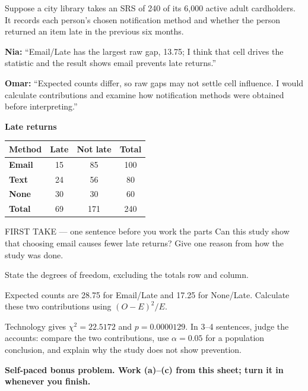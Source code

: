 \documentclass[14pt]{extarticle}
\begin{document}
\pagestyle{empty}


\noindent\begin{minipage}[t]{0.57\linewidth}
\vspace{0pt}
Suppose a city library takes an SRS of 240 of its 6,000 active adult cardholders. It records each person's chosen notification method and whether the person returned an item late in the previous six months.\par\smallskip \textbf{Nia:} ``Email/Late has the largest raw gap, 13.75; I think that cell drives the statistic and the result shows email prevents late returns.''\par \textbf{Omar:} ``Expected counts differ, so raw gaps may not settle cell influence. I would calculate contributions and examine how notification methods were obtained before interpreting.''\par
\end{minipage}\hfill
\begin{minipage}[t]{0.40\linewidth}
\vspace{0pt}
\begin{center}
\textbf{Late returns}\par\smallskip
\begin{tabular}{|l|c|c|c|}
\hline
\textbf{Method} & \textbf{Late} & \textbf{Not late} & \textbf{Total} \\ \hline
\textbf{Email} & 15 & 85 & 100 \\ \hline
\textbf{Text} & 24 & 56 & 80 \\ \hline
\textbf{None} & 30 & 30 & 60 \\ \hline
\textbf{Total} & 69 & 171 & 240 \\ \hline
\end{tabular}
\end{center}
\end{minipage}

\begin{firsttakebox}{FIRST TAKE --- one sentence before you work the parts}
Can this study show that choosing email causes fewer late returns? Give one reason from how the study was done.
\end{firsttakebox}

\begin{description}[leftmargin=1.15in, labelwidth=1in, itemsep=2pt, topsep=2pt]
  \item[\dokbadge{1}~(a)] State the degrees of freedom, excluding the totals row and column.
  \item[\dokbadge{2}~(b)] Expected counts are 28.75 for Email/Late and 17.25 for None/Late. Calculate these two contributions using $(O-E)^2/E$.
  \item[\dokbadge{3}~(c)] Technology gives $\chi^2=22.5172$ and $p=0.0000129$. In 3--4 sentences, judge the accounts: compare the two contributions, use $\alpha=0.05$ for a population conclusion, and explain why the study does not show prevention.
\end{description}

\vfill
\textbf{Self-paced bonus problem. Work (a)--(c) from this sheet; turn it in whenever you finish.}
\end{document}
